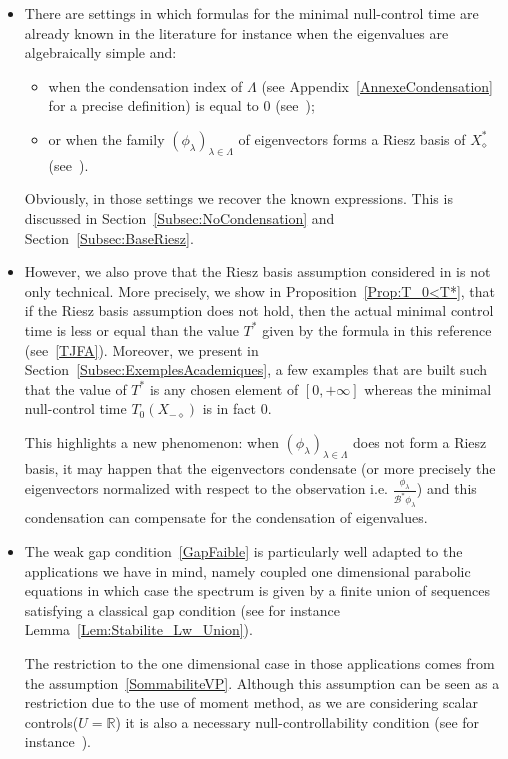 \documentclass[AHL,Unicode,longabstracts]{cedram}
\newcommand\Bs{\mathcal{B}^*}
\newcommand{\Xalphas}{X_\diamond^*}
\newcommand{\Xmalpha}{X_{-\diamond}}
\newcommand{\R}{\mathbb{R}}
\begin{document}
\begin{itemize}
\item There are settings in which formulas for the minimal null-control time are already known in the literature for instance when the eigenvalues are algebraically simple and:
\begin{itemize}
\item when the condensation index of $\Lambda$ (see Appendix~\ref{AnnexeCondensation} for a precise definition) is equal to $0$ (see~\cite[Remark~1.15]{AKBGBM_2018});
\item or when the family $(\phi_\lambda)_{\lambda\in \Lambda}$ of eigenvectors forms a Riesz basis of $\Xalphas$ (see~\cite{AmmarKhodjaBenabdallahGonzalez-BurgosdeTeresa:2014}).
\end{itemize}
Obviously, in those settings we recover the known expressions. This is discussed in Section~\ref{Subsec:NoCondensation} and Section~\ref{Subsec:BaseRiesz}.
\item However, we also prove that the Riesz basis assumption considered in\linebreak \cite{AmmarKhodjaBenabdallahGonzalez-BurgosdeTeresa:2014} is not only technical. More precisely, we show in Proposition~\ref{Prop:T_0<T*}, that if the Riesz basis assumption does not hold, then the actual minimal control time is less or equal than the value $T^*$ given by the formula in this reference (see~\eqref{TJFA}). Moreover, we present in Section~\ref{Subsec:ExemplesAcademiques}, a few examples that are built such that the value of $T^*$ is any chosen element of $[0, +\infty]$ whereas the minimal null-control time $T_0(\Xmalpha)$ is in fact $0$.

This highlights a new phenomenon: when $(\phi_\lambda)_{\lambda\in \Lambda}$ does not form a Riesz basis, it may happen that the eigenvectors condensate (or more precisely the eigenvectors normalized with respect to the observation i.e. $\frac{\phi_\lambda}{\Bs \phi_\lambda}$) and this condensation can compensate for the condensation of eigenvalues.
\item The weak gap condition~\eqref{GapFaible} is particularly well adapted to the applications we have in mind, namely coupled one dimensional parabolic equations in which case the spectrum is given by a finite union of sequences satisfying a classical gap condition (see for instance Lemma~\ref{Lem:Stabilite_Lw_Union}).

The restriction to the one dimensional case in those applications comes from the assumption~\eqref{SommabiliteVP}. Although this assumption can be seen as a restriction due to the use of moment method, as we are considering scalar controls\linebreak($U=\R$) it is also a necessary null-controllability condition (see for instance~\cite[Appendix A]{Miller06}).


\end{itemize}
\end{document}
